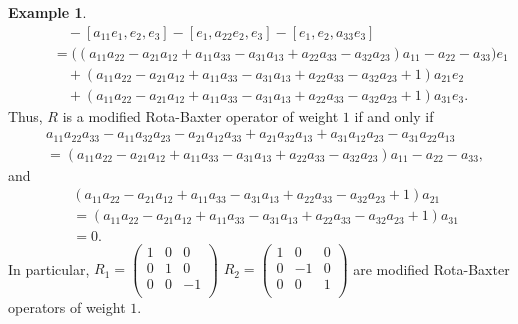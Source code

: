\documentclass[12pt]{amsart}
\theoremstyle{definition}
\newtheorem{exam}[theorem]{Example}
\begin{document}
\begin{exam}
\begin{align*}
\quad\quad &\quad- [a_{11}e_1, e_2, e_3]-[e_1, a_{22}e_2, e_3]-[e_1, e_2, a_{33}e_3]\\
&=\big((a_{11}a_{22}-a_{21}a_{12} + a_{11}a_{33}-a_{31}a_{13} + a_{22}a_{33}-a_{32}a_{23})a_{11}-a_{22}-a_{33}\big)e_1\\
\quad\quad &\quad+(a_{11}a_{22}-a_{21}a_{12} + a_{11}a_{33}-a_{31}a_{13} + a_{22}a_{33}-a_{32}a_{23}+1)a_{21}e_2\\
\quad\quad &\quad+(a_{11}a_{22}-a_{21}a_{12} + a_{11}a_{33}-a_{31}a_{13} + a_{22}a_{33}-a_{32}a_{23}+1)a_{31}e_3.
\end{align*}
Thus, $R$ is a modified Rota-Baxter operator of weight $1$ if and only if
\begin{align*}
&a_{11}a_{22}a_{33}-a_{11}a_{32}a_{23}-a_{21}a_{12}a_{33} + a_{21}a_{32}a_{13} + a_{31}a_{12}a_{23}-a_{31}a_{22}a_{13}\\
&=(a_{11}a_{22}-a_{21}a_{12} + a_{11}a_{33}-a_{31}a_{13} + a_{22}a_{33}-a_{32}a_{23})a_{11}-a_{22}-a_{33},
\end{align*}
and
\begin{align*}
&(a_{11}a_{22}-a_{21}a_{12} + a_{11}a_{33}-a_{31}a_{13} + a_{22}a_{33}-a_{32}a_{23}+1)a_{21}\\
&= (a_{11}a_{22}-a_{21}a_{12} + a_{11}a_{33}-a_{31}a_{13} + a_{22}a_{33}-a_{32}a_{23}+1)a_{31}\\
&=0.
\end{align*}
In particular, $R_1=\left(
                                            \begin{array}{ccc}
                                             1  & 0 & 0\\
                                             0& 1& 0\\
                                             0& 0& -1\\
                                            \end{array}
                                          \right)$     $R_2=\left(
                                         \begin{array}{ccc}
                                             1  & 0 & 0\\
                                             0& -1& 0\\
                                             0& 0& 1\\
                                            \end{array}
                                          \right)$  are modified Rota-Baxter operators of weight $1$.


\end{exam}
\end{document}

